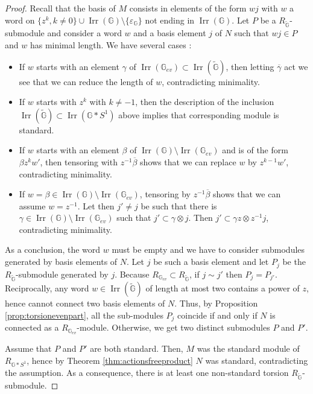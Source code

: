 \documentclass[a4paper, 11pt]{amsart}
\theoremstyle{plain}
\theoremstyle{definition}
\theoremstyle{remark}
\DeclareMathOperator{\Irr}{Irr}
\newcommand{\G}{\mathbb{G}}
\begin{document}
\begin{proof}
Recall that the basis of $M$ consists in elements of the form $wj$ with $w$ a word on $\{z^{k}, k\neq 0\}\cup\Irr(\G)\setminus\{\varepsilon_{\G}\}$ not ending in $\Irr(\G)$. Let $P$ be a $R_{\widetilde{\G}}$-submodule and consider a word $w$ and a basis element $j$ of $N$ such that $wj\in P$ and $w$ has minimal length. We have several cases :
\begin{itemize}
\item If $w$ starts with an element $\gamma$ of $\Irr(\G_{ev})\subset\Irr(\widetilde{\G})$, then letting $\overline{\gamma}$ act we see that we can reduce the length of $w$, contradicting minimality.
\item If $w$ starts with $z^{k}$ with $k\neq -1$, then the description of the inclusion $\Irr(\widetilde{\G})\subset \Irr(\G\ast S^{1})$ above implies that corresponding module is standard.
\item If $w$ starts with an element $\beta$ of $\Irr(\G)\setminus\Irr(\G_{ev})$ and is of the form $\beta z^{k}w'$, then tensoring with $z^{-1}\overline{\beta}$ shows that we can replace $w$ by $z^{k-1}w'$, contradicting minimality.
\item If $w = \beta\in\Irr(\G)\setminus\Irr(\G_{ev})$, tensoring by $z^{-1}\overline{\beta}$ shows that we can assume $w=z^{-1}$. Let then $j'\neq j$ be such that there is $\gamma\in \Irr(\G)\setminus\Irr(\G_{ev})$ such that $j'\subset \gamma\otimes j$. Then $j'\subset \gamma z\otimes z^{-1}j$, contradicting minimality.
\end{itemize}
As a conclusion, the word $w$ must be empty and we have to consider submodules generated by basis elements of $N$. Let $j$ be such a basis element and let $P_{j}$ be the $R_{\widetilde{\G}}$-submodule generated by $j$. Because $R_{\G_{ev}}\subset R_{\widetilde{\G}}$, if $j\sim j'$ then $P_{j} = P_{j'}$. Reciprocally, any word $w\in \Irr(\widetilde{\G})$ of length at most two contains a power of $z$, hence cannot connect two basis elements of $N$. Thus, by Proposition \ref{prop:torsionevenpart}, all the sub-modules $P_{j}$ coincide if and only if $N$ is connected as a $R_{\G_{ev}}$-module. Otherwise, we get two distinct submodules $P$ and $P'$.

Assume that $P$ and $P'$ are both standard. Then, $M$ was the standard module of $R_{\G\ast S^{1}}$, hence by Theorem \ref{thm:actionsfreeproduct} $N$ was standard, contradicting the assumption. As a consequence, there is at least one non-standard torsion $R_{\widetilde{\G}}$-submodule.
\end{proof}
\end{document}
